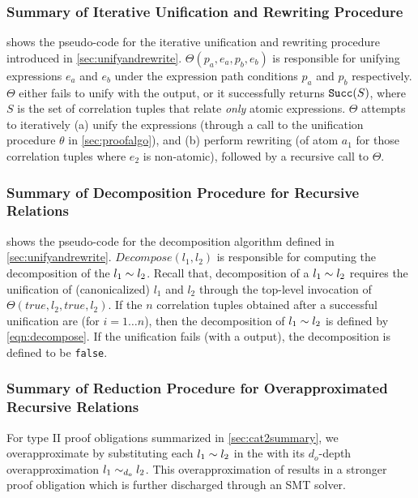 

\subsubsection{Summary of Iterative Unification and Rewriting Procedure}
\label{sec:unifyandrewritealgo}
 shows the pseudo-code for the iterative unification and rewriting procedure
introduced in \cref{sec:unifyandrewrite}.
$\Theta(p_a,e_a,p_b,e_b)$ is responsible for unifying expressions $e_a$ and $e_b$ under the expression
path conditions $p_a$ and $p_b$ respectively.
$\Theta$ either fails to unify with the  output, or it successfully returns ${\tt Succ}(S)$, where $S$
is the set of correlation tuples that relate {\em only} atomic expressions.
$\Theta$ attempts to iteratively (a) unify the expressions (through a call to the unification procedure $\theta$ in \cref{sec:proofalgo}),
and (b) perform rewriting (of atom $a_1$ for those correlation tuples  where $e_2$ is non-atomic), followed by
a recursive call to $\Theta$.



\subsubsection{Summary of Decomposition Procedure for Recursive Relations}
\label{sec:decomposealgo}
 shows the pseudo-code for the decomposition algorithm defined in \cref{sec:unifyandrewrite}.
$Decompose(l_1, l_2)$ is responsible for computing the decomposition of the \recursiveRelation{} $l_1 \sim{} l_2$.
Recall that, decomposition of a \recursiveRelation{} $l_1 \sim{} l_2$ requires the unification of (canonicalized)
$l_1$ and $l_2$ through the top-level invocation of $\Theta(true,l_2,true,l_2)$.
If the $n$ correlation tuples obtained after a successful unification are 
(for $i=1\ldots n$), then the decomposition of $l_1 \sim{} l_2$ is defined by \cref{eqn:decompose}.
If the unification fails (with a  output), the decomposition is defined to be {\tt false}.



\subsubsection{Summary of Reduction Procedure for Overapproximated Recursive Relations}
\label{sec:overapproxalgo}
For type II proof obligations summarized in \cref{sec:cat2summary},
we overapproximate \lhs{} by substituting each \recursiveRelations{} $l_1 \sim{} l_2$ in the \lhs{}
with its $d_o$-depth overapproximation $l_1 \sim_{d_o} l_2$.
This overapproximation of \lhs{} results in a stronger proof obligation which is further
discharged through an SMT solver.

